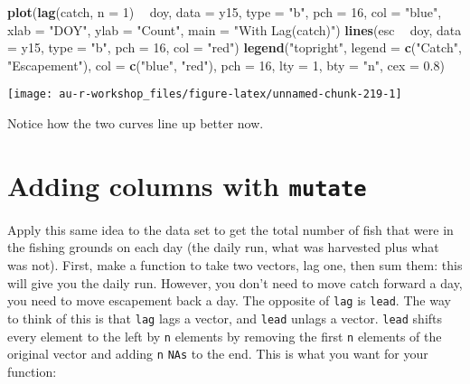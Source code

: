 \documentclass[]{book}
\newenvironment{Shaded}{\begin{snugshade}}{\end{snugshade}}
\newcommand{\KeywordTok}[1]{\textcolor[rgb]{0.13,0.29,0.53}{\textbf{#1}}}
\newcommand{\DataTypeTok}[1]{\textcolor[rgb]{0.13,0.29,0.53}{#1}}
\newcommand{\DecValTok}[1]{\textcolor[rgb]{0.00,0.00,0.81}{#1}}
\newcommand{\FloatTok}[1]{\textcolor[rgb]{0.00,0.00,0.81}{#1}}
\newcommand{\StringTok}[1]{\textcolor[rgb]{0.31,0.60,0.02}{#1}}
\newcommand{\OperatorTok}[1]{\textcolor[rgb]{0.81,0.36,0.00}{\textbf{#1}}}
\newcommand{\NormalTok}[1]{#1}
\theoremstyle{definition}
\theoremstyle{definition}
\theoremstyle{definition}
\theoremstyle{remark}
\begin{document}
\begin{Shaded}
\begin{Highlighting}[]
\KeywordTok{plot}\NormalTok{(}\KeywordTok{lag}\NormalTok{(catch, }\DataTypeTok{n =} \DecValTok{1}\NormalTok{) }\OperatorTok{~}\StringTok{ }\NormalTok{doy, }\DataTypeTok{data =}\NormalTok{ y15, }\DataTypeTok{type =} \StringTok{"b"}\NormalTok{, }\DataTypeTok{pch =} \DecValTok{16}\NormalTok{, }\DataTypeTok{col =} \StringTok{"blue"}\NormalTok{,}
     \DataTypeTok{xlab =} \StringTok{"DOY"}\NormalTok{, }\DataTypeTok{ylab =} \StringTok{"Count"}\NormalTok{, }\DataTypeTok{main =} \StringTok{"With Lag(catch)"}\NormalTok{)}
\KeywordTok{lines}\NormalTok{(esc }\OperatorTok{~}\StringTok{ }\NormalTok{doy, }\DataTypeTok{data =}\NormalTok{ y15, }\DataTypeTok{type =} \StringTok{"b"}\NormalTok{, }\DataTypeTok{pch =} \DecValTok{16}\NormalTok{, }\DataTypeTok{col =} \StringTok{"red"}\NormalTok{)}
\KeywordTok{legend}\NormalTok{(}\StringTok{"topright"}\NormalTok{, }\DataTypeTok{legend =} \KeywordTok{c}\NormalTok{(}\StringTok{"Catch"}\NormalTok{, }\StringTok{"Escapement"}\NormalTok{),}
       \DataTypeTok{col =} \KeywordTok{c}\NormalTok{(}\StringTok{"blue"}\NormalTok{, }\StringTok{"red"}\NormalTok{), }\DataTypeTok{pch =} \DecValTok{16}\NormalTok{, }\DataTypeTok{lty =} \DecValTok{1}\NormalTok{, }\DataTypeTok{bty =} \StringTok{"n"}\NormalTok{, }\DataTypeTok{cex =} \FloatTok{0.8}\NormalTok{)}
\end{Highlighting}
\end{Shaded}

\begin{center}\texttt{[image: au-r-workshop\_files/figure-latex/unnamed-chunk-219-1]} \end{center}

Notice how the two curves line up better now.

\section{\texorpdfstring{Adding columns with
\texttt{mutate}}{Adding columns with mutate}}\label{adding-columns-with-mutate}

Apply this same idea to the data set to get the total number of fish
that were in the fishing grounds on each day (the daily run, what was
harvested plus what was not). First, make a function to take two
vectors, lag one, then sum them: this will give you the daily run.
However, you don't need to move catch forward a day, you need to move
escapement back a day. The opposite of \texttt{lag} is \texttt{lead}.
The way to think of this is that \texttt{lag} lags a vector, and
\texttt{lead} unlags a vector. \texttt{lead} shifts every element to the
left by \texttt{n} elements by removing the first \texttt{n} elements of
the original vector and adding \texttt{n} \texttt{NAs} to the end. This
is what you want for your function:
\end{document}
